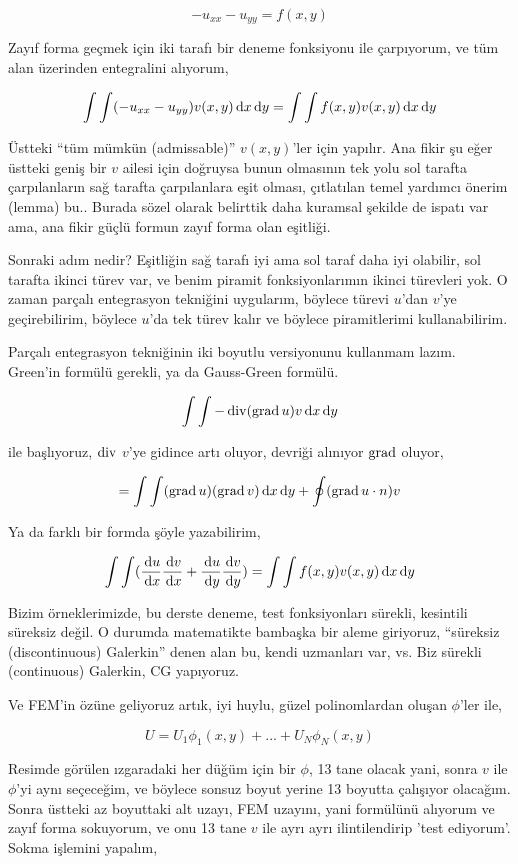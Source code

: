 \documentclass[12pt,fleqn]{article}\usepackage{../../common}
\begin{document}
$$
-u_{xx} - u_{yy} = f(x,y)
$$

Zayıf forma geçmek için iki tarafı bir deneme fonksiyonu ile çarpıyorum,
ve tüm alan üzerinden entegralini alıyorum,

$$
\int \int (-u_{xx} - u_{yy}) v(x,y) \,\mathrm{d} x \,\mathrm{d} y =
\int \int f(x,y) v(x,y)  \,\mathrm{d} x \,\mathrm{d} y
$$

Üstteki ``tüm mümkün (admissable)'' $v(x,y)$'ler için yapılır. Ana fikir şu eğer
üstteki geniş bir $v$ ailesi için doğruysa bunun olmasının tek yolu sol tarafta
çarpılanların sağ tarafta çarpılanlara eşit olması, çıtlatılan temel yardımcı
önerim (lemma) bu.. Burada sözel olarak belirttik daha kuramsal şekilde de
ispatı var ama, ana fikir güçlü formun zayıf forma olan eşitliği.

Sonraki adım nedir? Eşitliğin sağ tarafı iyi ama sol taraf daha iyi olabilir,
sol tarafta ikinci türev var, ve benim piramit fonksiyonlarımın ikinci türevleri
yok. O zaman parçalı entegrasyon tekniğini uygularım, böylece türevi $u$'dan
$v$'ye geçirebilirim, böylece $u$'da tek türev kalır ve böylece piramitlerimi
kullanabilirim. 

Parçalı entegrasyon tekniğinin iki boyutlu versiyonunu kullanmam lazım. Green'in
formülü gerekli, ya da Gauss-Green formülü. 

$$
\int \int -\operatorname{div} (\operatorname{grad} u) v \,\mathrm{d} x \,\mathrm{d} y
$$

ile başlıyoruz, $\operatorname{div}$ $v$'ye gidince artı oluyor, devriği alınıyor $\operatorname{grad}$
oluyor, 

$$
= \int \int
(\operatorname{grad} u) (\operatorname{grad} v) \,\mathrm{d} x \,\mathrm{d} y  +
\oint (\operatorname{grad} u \cdot n) v
$$

Ya da farklı bir formda şöyle yazabilirim, 

$$
\int \int
(
\frac{\,\mathrm{d} u}{\,\mathrm{d} x} \frac{\,\mathrm{d} v}{\,\mathrm{d} x} +
\frac{\,\mathrm{d} u}{\,\mathrm{d} y} \frac{\,\mathrm{d} v}{\,\mathrm{d} y} 
) =
\int \int f(x,y) v(x,y)  \,\mathrm{d} x \,\mathrm{d} y
$$

Bizim örneklerimizde, bu derste deneme, test fonksiyonları sürekli, kesintili
süreksiz değil. O durumda matematikte bambaşka bir aleme giriyoruz, ``süreksiz
(discontinuous) Galerkin'' denen alan bu, kendi uzmanları var, vs. Biz sürekli
(continuous) Galerkin, CG yapıyoruz.

Ve FEM'in özüne geliyoruz artık, iyi huylu, güzel polinomlardan oluşan
$\phi$'ler ile,

$$
U = U_1 \phi_1 (x,y) + ... + U_N \phi_N (x,y) 
$$

Resimde görülen ızgaradaki her düğüm için bir $\phi$, 13 tane olacak yani, sonra
$v$ ile $\phi$'yi aynı seçeceğim, ve böylece sonsuz boyut yerine 13 boyutta
çalışıyor olacağım. Sonra üstteki az boyuttaki alt uzayı, FEM uzayını, yani
formülünü alıyorum ve zayıf forma sokuyorum, ve onu 13 tane $v$ ile ayrı ayrı
ilintilendirip 'test ediyorum'. Sokma işlemini yapalım,
\end{document}
